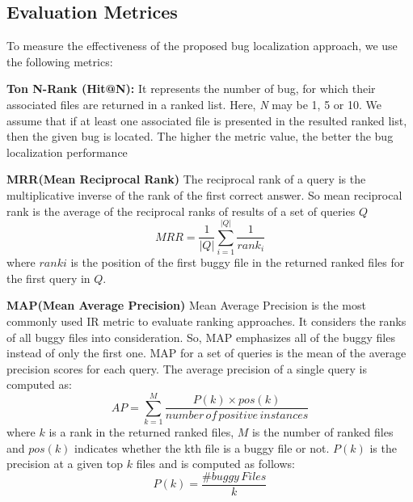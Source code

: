 \documentclass[conference]{IEEEtran}
\begin{document}
\subsection{Evaluation Metrices}
To measure the effectiveness of the proposed bug localization approach, we use the following metrics:

\textbf{Ton N-Rank (Hit@N):} It represents the number of bug, for which their associated files are returned in a ranked list. Here, \textit{N} may be 1, 5 or 10. We assume that if at least one associated file is presented in the resulted ranked list, then the given bug is located. The higher the metric value, the better the bug localization performance

\textbf{MRR(Mean Reciprocal Rank)}
The reciprocal rank of a query is the multiplicative inverse of the rank of the first correct answer. So mean reciprocal rank is the average of the reciprocal ranks of results of a set of queries $Q$
\begin{equation}
MRR=\frac{1}{\left | Q \right |}\sum_{i=1}^{\left | Q \right |}\frac{1}{rank_{i}}
\end{equation}
where $ranki$ is the position of the first buggy file in the returned ranked files for the first query in $Q$.

\textbf{MAP(Mean Average Precision)}
Mean Average Precision is the most commonly used IR metric to evaluate ranking approaches. It considers the ranks of all buggy files into consideration. So, MAP emphasizes all of the buggy files instead of only the first one.
MAP for a set of queries is the mean of the average precision scores for each query. The average precision of a single query is computed as:
\begin{equation}
AP=\sum_{k=1}^{M}\frac{P(k)\times pos(k)}{number \, of \, positive \, instances}
\end{equation}
where $k$ is a rank in the returned ranked files, $M$ is the number of ranked files and $pos(k)$ indicates whether the kth file is a buggy file or not. $P(k)$ is the precision at a given top $k$ files and is computed as follows:
\begin{equation}
P(k)=\frac{\#buggy \, Files}{k}
\end{equation}

%
\end{document}
